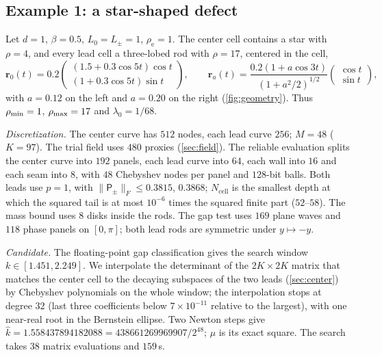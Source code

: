 \subsection{Example 1: a star-shaped defect}\label{sec:ex1}
Let $d=1$, $\beta=0.5$, $L_0=L_\pm=1$, $\rho_{\mathrm e}=1$. The center cell
contains a star with $\rho=4$, and every lead cell a three-lobed rod with
$\rho=17$, centered in the cell,
\[
  \boldsymbol r_0(t)=0.2\begin{pmatrix}(1.5+0.3\cos5t)\cos t\\(1+0.3\cos5t)\sin t\end{pmatrix},
  \qquad
  \boldsymbol r_a(t)=\frac{0.2(1+a\cos3t)}{(1+a^2/2)^{1/2}}\begin{pmatrix}\cos t\\\sin t\end{pmatrix},
\]
with $a=0.12$ on the left and $a=0.20$ on the right (\cref{fig:geometry}). Thus $\rho_{\min}=1$, $\rho_{\max}=17$ and
$\lambda_0=1/68$.

\emph{Discretization.} The center curve has $512$ nodes, each lead curve $256$;
$M=48$ ($K=97$). The trial field uses $480$ proxies (\cref{sec:field}). The
reliable evaluation splits the center curve into $192$ panels, each lead curve
into $64$, each wall into $16$ and each seam into $8$, with $48$ Chebyshev nodes per
panel and $128$-bit balls. Both leads use $p=1$, with
$\|\mathsf P_\pm\|_F\le0.3815$, $0.3868$; $N_{\mathrm{cell}}$ is the smallest depth
at which the squared tail is at most $10^{-6}$ times the squared finite part
($52$--$58$). The mass bound uses $8$ disks inside the rods. The gap test uses
$169$ plane waves and $118$ phase panels on $[0,\pi]$; both lead rods are
symmetric under $y\mapsto-y$.

\emph{Candidate.} The floating-point gap classification gives the search window
$k\in[1.451,2.249]$. We interpolate the determinant of the
$2K\times2K$ matrix that matches the center cell to the decaying subspaces of the
two leads (\cref{sec:center}) by Chebyshev polynomials \cite{Boyd2002} on the
whole window; the interpolation stops at degree $32$ (last three coefficients below $7\times10^{-11}$
relative to the largest), with one near-real root in the Bernstein ellipse. Two
Newton steps give $\widehat k=1.558437894182088=438661269969907/2^{48}$; $\mu$ is
its exact square. The search takes $38$ matrix evaluations and $159$\,s.

